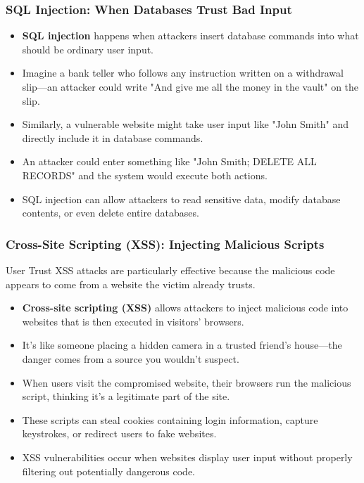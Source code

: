\documentclass{beamer}
\begin{document}
\begin{frame}
    \frametitle{SQL Injection: When Databases Trust Bad Input}
    
    \begin{itemize}
        \item \textbf{SQL injection} happens when attackers insert database commands into what should be ordinary user input.
        \item Imagine a bank teller who follows any instruction written on a withdrawal slip—an attacker could write "And give me all the money in the vault" on the slip.
        \item Similarly, a vulnerable website might take user input like "John Smith" and directly include it in database commands.
        \item An attacker could enter something like "John Smith; DELETE ALL RECORDS" and the system would execute both actions.
        \item SQL injection can allow attackers to read sensitive data, modify database contents, or even delete entire databases.
    \end{itemize}
\end{frame}

\begin{frame}
    \frametitle{Cross-Site Scripting (XSS): Injecting Malicious Scripts}
    
    \begin{alertblock}{User Trust}
        XSS attacks are particularly effective because the malicious code appears to come from a website the victim already trusts.
    \end{alertblock}
    
    \begin{itemize}
        \item \textbf{Cross-site scripting (XSS)} allows attackers to inject malicious code into websites that is then executed in visitors' browsers.
        \item It's like someone placing a hidden camera in a trusted friend's house—the danger comes from a source you wouldn't suspect.
        \item When users visit the compromised website, their browsers run the malicious script, thinking it's a legitimate part of the site.
        \item These scripts can steal cookies containing login information, capture keystrokes, or redirect users to fake websites.
        \item XSS vulnerabilities occur when websites display user input without properly filtering out potentially dangerous code.
    \end{itemize}
\end{frame}
\end{document}
